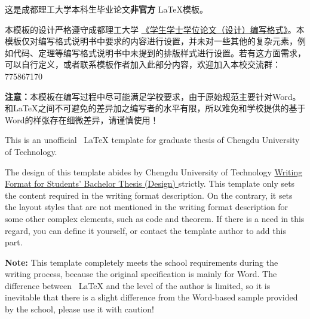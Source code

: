 \documentclass{cdut_thesis}
\begin{document}

\fronthead
\makezhcover

\begin{chineseabstract}
这是成都理工大学本科生毕业论文\textbf{非官方} \LaTeX 模板。

本模板的设计严格遵守成都理工大学  \href{http://202.115.140.232/shownews.aspx?newsno=MX87I+hJrZ85EKiYIeQKWw....}{{\color{red} 《学生学士学位论文（设计）编写格式》}}。本模板仅对编写格式说明书中要求的内容进行设置，并未对一些其他的复杂元素，例如代码、定理等编写格式说明书中未提到的排版样式进行设置。若有这方面需求，可以自行定义，或者联系模板作者加入此部分内容，欢迎加入本校交流群：775867170

\textbf{注意：}本模板在编写过程中尽可能满足学校要求，由于原始规范主要针对Word。和\LaTeX 之间不可避免的差异加之编写者的水平有限，所以难免和学校提供的基于Word的样张存在细微差异，请谨慎使用！
\end{chineseabstract}



\begin{englishabstract}
This is an unofficial \ LaTeX template for graduate thesis of Chengdu University of Technology.

The design of this template abides by Chengdu University of Technology \href{http: //202.115.140.232/shownews.aspx? newsno = MX87I + hJrZ85EKiYIeQKWw ....}{{\color{red}Writing Format for Students' Bachelor Thesis (Design) }} strictly. This template only sets the content required in the writing format description. On the contrary, it sets the layout styles that are not mentioned in the writing format description for some other complex elements, such as code and theorem. If there is a need in this regard, you can define it yourself, or contact the template author to add this part.

\textbf{Note:} This template completely meets the school requirements during the writing process, because the original specification is mainly for Word. The difference between \ LaTeX and the level of the author is limited, so it is inevitable that there is a slight difference from the Word-based sample provided by the school, please use it with caution!
\end{englishabstract}

\newpage
\tableofcontents

\newpage
\texthead










\end{document}

